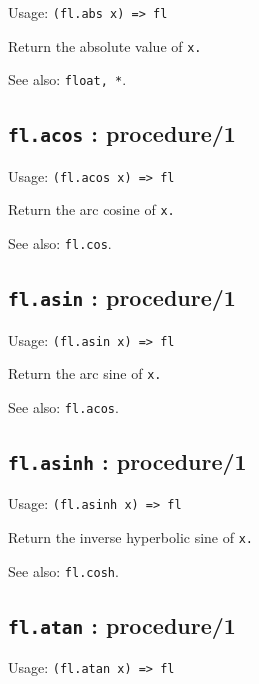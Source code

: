 \documentclass[
]{article}
\newcommand{\passthrough}[1]{#1}
\begin{document}
Usage: \passthrough{\lstinline!(fl.abs x) => fl!}

Return the absolute value of \passthrough{\lstinline!x.!}

See also: \passthrough{\lstinline!float, *!}.

\hypertarget{fl.acos-procedure1-1}{%
\subsection{\texorpdfstring{\texttt{fl.acos} :
procedure/1}{fl.acos : procedure/1}}\label{fl.acos-procedure1-1}}

Usage: \passthrough{\lstinline!(fl.acos x) => fl!}

Return the arc cosine of \passthrough{\lstinline!x.!}

See also: \passthrough{\lstinline!fl.cos!}.

\hypertarget{fl.asin-procedure1-1}{%
\subsection{\texorpdfstring{\texttt{fl.asin} :
procedure/1}{fl.asin : procedure/1}}\label{fl.asin-procedure1-1}}

Usage: \passthrough{\lstinline!(fl.asin x) => fl!}

Return the arc sine of \passthrough{\lstinline!x.!}

See also: \passthrough{\lstinline!fl.acos!}.

\hypertarget{fl.asinh-procedure1-1}{%
\subsection{\texorpdfstring{\texttt{fl.asinh} :
procedure/1}{fl.asinh : procedure/1}}\label{fl.asinh-procedure1-1}}

Usage: \passthrough{\lstinline!(fl.asinh x) => fl!}

Return the inverse hyperbolic sine of \passthrough{\lstinline!x.!}

See also: \passthrough{\lstinline!fl.cosh!}.

\hypertarget{fl.atan-procedure1-1}{%
\subsection{\texorpdfstring{\texttt{fl.atan} :
procedure/1}{fl.atan : procedure/1}}\label{fl.atan-procedure1-1}}

Usage: \passthrough{\lstinline!(fl.atan x) => fl!}
\end{document}
